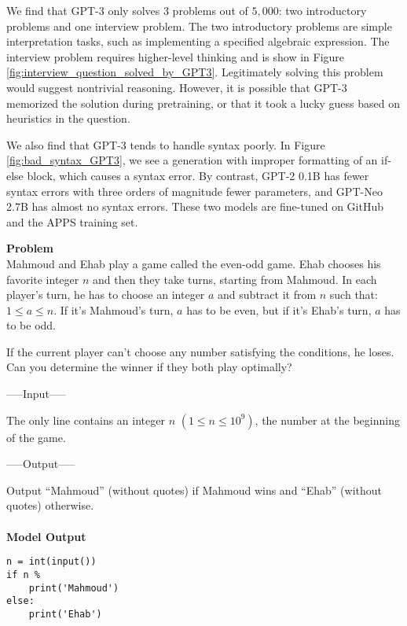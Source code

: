 We find that GPT-3 only solves $3$ problems out of $5,\!000$: two introductory problems and one interview problem. The two introductory problems are simple interpretation tasks, such as implementing a specified algebraic expression. The interview problem requires higher-level thinking and is show in Figure \ref{fig:interview_question_solved_by_GPT3}. Legitimately solving this problem would suggest nontrivial reasoning. However, it is possible that GPT-3 memorized the solution during pretraining, or that it took a lucky guess based on heuristics in the question.

We also find that GPT-3 tends to handle syntax poorly. In Figure \ref{fig:bad_syntax_GPT3}, we see a generation with improper formatting of an if-else block, which causes a syntax error. By contrast, GPT-2 0.1B has fewer syntax errors with three orders of magnitude fewer parameters, and GPT-Neo 2.7B has almost no syntax errors. These two models are fine-tuned on GitHub and the APPS training set.



\begin{figure*}
    \textbf{Problem} \\
    Mahmoud and Ehab play a game called the even-odd game. Ehab chooses his favorite integer $n$ and then they take turns, starting from Mahmoud. In each player's turn, he has to choose an integer $a$ and subtract it from $n$ such that:  $1 \leq a \leq n$.  If it's Mahmoud's turn, $a$ has to be even, but if it's Ehab's turn, $a$ has to be odd. 

    If the current player can't choose any number satisfying the conditions, he loses. Can you determine the winner if they both play optimally?
    
    \vspace{2mm}
    -----Input-----
    
    The only line contains an integer $n$ $(1 \leq n \leq 10^9)$, the number at the beginning of the game.
    
    \vspace{2mm}
    -----Output-----
    
    Output ``Mahmoud'' (without quotes) if Mahmoud wins and ``Ehab'' (without quotes) otherwise.
 \\
 \\
 \textbf{Model Output}
 \begin{small}
 \begin{verbatim}
n = int(input())
if n %
    print('Mahmoud')
else:
    print('Ehab')
\end{verbatim}
 \end{small}
    \caption{The sole interview problem solved by GPT-3. Legitimately solving this problem requires nontrivial reasoning about the proposed game's branching possibilities.}
    \label{fig:interview_question_solved_by_GPT3}
\end{figure*}


